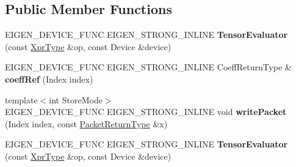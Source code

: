 \subsection*{Public Member Functions}
\begin{DoxyCompactItemize}
\item 
\mbox{\label{struct_eigen_1_1_tensor_evaluator_3_01_tensor_slicing_op_3_01_start_indices_00_01_sizes_00_01_arg_type_01_4_00_01_device_01_4_a19ee8e4fb09599a79174e7945de75cfe}} 
E\+I\+G\+E\+N\+\_\+\+D\+E\+V\+I\+C\+E\+\_\+\+F\+U\+NC E\+I\+G\+E\+N\+\_\+\+S\+T\+R\+O\+N\+G\+\_\+\+I\+N\+L\+I\+NE {\bfseries Tensor\+Evaluator} (const \hyperlink{class_eigen_1_1_tensor_slicing_op}{Xpr\+Type} \&op, const Device \&device)
\item 
\mbox{\label{struct_eigen_1_1_tensor_evaluator_3_01_tensor_slicing_op_3_01_start_indices_00_01_sizes_00_01_arg_type_01_4_00_01_device_01_4_a3efd34c3be7ab542192f902cafed8eeb}} 
E\+I\+G\+E\+N\+\_\+\+D\+E\+V\+I\+C\+E\+\_\+\+F\+U\+NC E\+I\+G\+E\+N\+\_\+\+S\+T\+R\+O\+N\+G\+\_\+\+I\+N\+L\+I\+NE Coeff\+Return\+Type \& {\bfseries coeff\+Ref} (Index index)
\item 
\mbox{\label{struct_eigen_1_1_tensor_evaluator_3_01_tensor_slicing_op_3_01_start_indices_00_01_sizes_00_01_arg_type_01_4_00_01_device_01_4_a835ccea753f607886a3f62cae2e743dc}} 
{\footnotesize template$<$int Store\+Mode$>$ }\\E\+I\+G\+E\+N\+\_\+\+D\+E\+V\+I\+C\+E\+\_\+\+F\+U\+NC E\+I\+G\+E\+N\+\_\+\+S\+T\+R\+O\+N\+G\+\_\+\+I\+N\+L\+I\+NE void {\bfseries write\+Packet} (Index index, const \hyperlink{group___sparse_core___module}{Packet\+Return\+Type} \&x)
\item 
\mbox{\label{struct_eigen_1_1_tensor_evaluator_3_01_tensor_slicing_op_3_01_start_indices_00_01_sizes_00_01_arg_type_01_4_00_01_device_01_4_a19ee8e4fb09599a79174e7945de75cfe}} 
E\+I\+G\+E\+N\+\_\+\+D\+E\+V\+I\+C\+E\+\_\+\+F\+U\+NC E\+I\+G\+E\+N\+\_\+\+S\+T\+R\+O\+N\+G\+\_\+\+I\+N\+L\+I\+NE {\bfseries Tensor\+Evaluator} (const \hyperlink{class_eigen_1_1_tensor_slicing_op}{Xpr\+Type} \&op, const Device \&device)

\end{DoxyCompactItemize}
